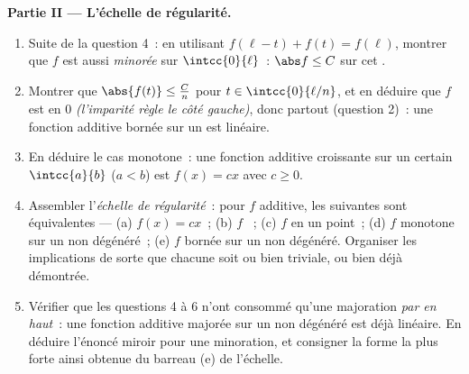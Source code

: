 \begin{problem}[{Devoir maison --- $f(x + y) = f(x) + f(y)$~:
la régularité force la linéarité, et le portrait des monstres}]
\medskip
\noindent\textbf{Partie II --- L'échelle de régularité.}
\begin{enumerate}[resume]
  \item Suite de la question 4~: en utilisant $f(\ell - t) + f(t) =
        f(\ell)$, montrer que $f$ est aussi \emph{minorée} sur
        $\intcc{0}{\ell}$~: $\abs f \leq C$ sur cet .
  \item Montrer que $\abs{f(t)} \leq \frac{C}{n}$ pour $t \in
        \intcc{0}{\ell/n}$, et en déduire que $f$ est  en
        $0$ \emph{(l'imparité règle le côté gauche)}, donc partout
        (question 2)~: une fonction additive bornée sur un
         est linéaire.
  \item En déduire le cas monotone~: une fonction additive
        croissante sur un certain $\intcc{a}{b}$ ($a < b$) est
        $f(x) = cx$ avec $c \geq 0$.
  \item Assembler l'\emph{échelle de régularité}~: pour $f$
        additive, les  suivantes sont équivalentes ---
        (a) $f(x) = cx$~; (b) $f$ ~; (c) $f$  en
        un point~; (d) $f$ monotone sur un  non
        dégénéré~; (e) $f$ bornée sur un  non dégénéré.
        Organiser les implications de sorte que chacune soit ou
        bien triviale, ou bien déjà démontrée.
  \item Vérifier que les questions 4 à 6 n'ont consommé qu'une
        majoration \emph{par en haut}~: une fonction additive
        majorée sur un  non dégénéré est déjà linéaire.
        En déduire l'énoncé miroir pour une minoration, et
        consigner la forme la plus forte ainsi obtenue du barreau
        (e) de l'échelle.
\end{enumerate}


\end{problem}
